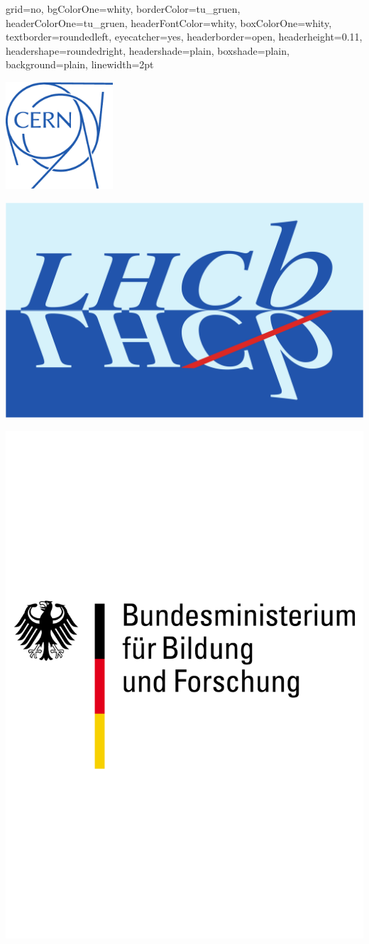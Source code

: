 \documentclass[a0poster,portrait,final,movebody=-5pt]{baposter}
\begin{document}
\newlength{\leftimgwidth}
\begin{poster}%
  {
  grid=no,
  bgColorOne=whity,%
  borderColor=tu_gruen,
  headerColorOne=tu_gruen,
  headerFontColor=whity,
  boxColorOne=whity,
  textborder=roundedleft,
  eyecatcher=yes,
  headerborder=open,
  headerheight=0.11\textheight,
  headershape=roundedright,
  headershade=plain,
  boxshade=plain,
  background=plain,
  linewidth=2pt
  }%
{\begin{minipage}[c]{0.20\textwidth}
\vspace{-1.6cm}
\includegraphics[width=0.3\textwidth]{figures/CERNLogoOutline.pdf}
\end{minipage}
\begin{minipage}[c]{0.20\textwidth}
\vspace{-1.6cm}\hspace{-1.8cm}
\includegraphics[height=0.3\textwidth]{figures/lhcb-logo.pdf}
\end{minipage}
\begin{minipage}[c]{0.20\textwidth}
\vspace{-1.6cm}\hspace{-2.5cm}
\includegraphics[height=0.3\textwidth]{figures/BMBF.pdf}

\end{minipage}}
\end{poster}
\end{document}
